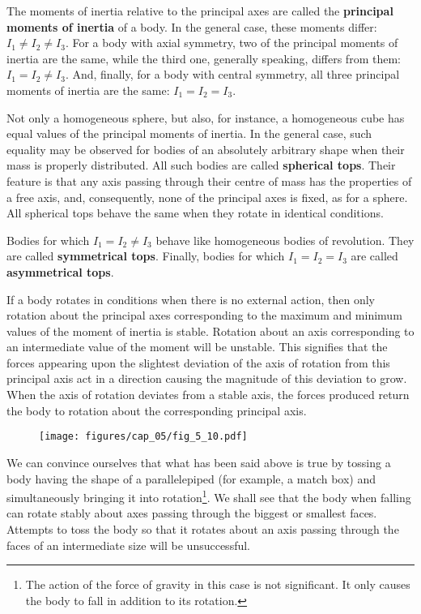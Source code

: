 The moments of inertia relative to the principal axes are called the \textbf{principal moments of inertia} of a body. In the general case, these moments differ: $I_1\neq I_2\neq I_3$. For a body with axial symmetry, two of the principal moments of inertia are the same, while the third one, generally speaking, differs from them: $I_1=I_2\neq I_3$. And, finally, for a body with central symmetry, all three principal moments of inertia are the same: $I_1=I_2=I_3$.

Not only a homogeneous sphere, but also, for instance, a homogeneous cube has equal values of the principal moments of inertia. In the general case, such equality may be observed for bodies of an absolutely arbitrary shape when their mass is properly distributed. All such bodies are called \textbf{spherical tops}. Their feature is that any axis passing through their centre of mass has the properties of a free axis, and, consequently, none of the principal axes is fixed, as for a sphere. All spherical tops behave the same when they rotate in identical conditions.

Bodies for which $I_1=I_2\neq I_3$ behave like homogeneous bodies of revolution. They are called \textbf{symmetrical tops}. Finally, bodies for which $I_1=I_2=I_3$ are called \textbf{asymmetrical tops}.

If a body rotates in conditions when there is no external action, then only rotation about the principal axes corresponding to the maximum and minimum values of the moment of inertia is stable. Rotation about an axis corresponding to an intermediate value of the moment will be unstable. This signifies that the forces appearing upon the slightest deviation of the axis of rotation from this principal axis act in a direction causing the magnitude of this deviation to grow. When the axis of rotation deviates from a stable axis, the forces produced return the body to rotation about the corresponding principal axis.

\begin{figure}[t]
	\begin{center}
		\texttt{[image: figures/cap\_05/fig\_5\_10.pdf]}
		\caption[]{}
		\label{fig:5_10}
	\end{center}
\vspace{-1.0cm}
\end{figure}

We can convince ourselves that what has been said above is true by tossing a body having the shape of a parallelepiped (for example, a match box) and simultaneously bringing it into rotation\footnote{The action of the force of gravity in this case is not significant. It only causes the body to fall in addition to its rotation.}. We shall see that the body when falling can rotate stably about axes passing through the biggest or smallest faces. Attempts to toss the body so that it rotates about an axis passing through the faces of an intermediate size will be unsuccessful.

